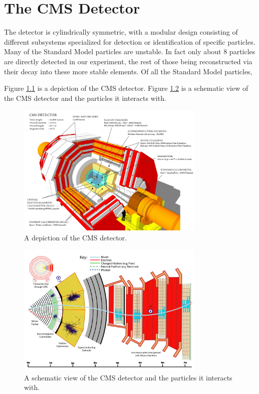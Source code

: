 \chapter{The CMS Detector}
\label{chap:detector}

The detector is cylindrically symmetric, with a modular design consisting of different subsystems specialized for detection or identification of specific particles. Many of the Standard Model particles are unstable. In fact only about 8 particles are directly detected in our experiment, the rest of those being reconstructed via their decay into these more stable elements. Of all the Standard Model particles, 

Figure \ref{fig:howcmsworks} is a depiction of the CMS detector. Figure \ref{fig:schematicview} is a schematic view of the CMS detector and the particles it interacts with.

\begin{figure}[htbp]
\centering
\includegraphics[width=90mm]{figs/howcmsworks.png}
\caption{A depiction of the CMS detector.}
\label{fig:howcmsworks}
\end{figure}

\begin{figure}[htbp]
\centering
\includegraphics[width=90mm]{figs/CMS-PRF-14-001_Figure_001.pdf}
\caption{A schematic view of the CMS detector and the particles it interacts with.}
\label{fig:schematicview}
\end{figure}

